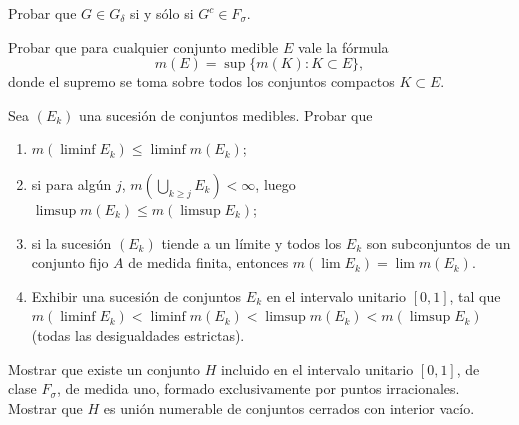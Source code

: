\documentclass{book}
\newcommand{\di}{\displaystyle}
\begin{document}
   \begin{ejer}{}  Probar que $G \in G_{\delta}$ si y sólo si $G^c \in F_{\sigma}$.
\end{ejer} 
 
%





    \begin{ejer}{} 
	Probar que para cualquier conjunto medible $E$ vale la fórmula
   $$m(E)=\sup\{m(K):K\subset E\}, $$
   donde el supremo se toma sobre todos los conjuntos compactos $K \subset E$.
\end{ejer} 

   \begin{ejer}{} 
	Sea $(E_k)$ una sucesión de conjuntos medibles. Probar que
	\begin{enumerate}
    \item $m(\liminf E_k)\leq \liminf m(E_k)$;
    \item si para alg\'un $j$, \;$m\left(\di\bigcup_{k\geq j}E_k\right)<\infty$, luego\; 
    $\limsup m(E_k)\leq m(\limsup E_k)$;
    \item si la sucesión $(E_k)$ tiende a un límite y todos los $E_k$ son subconjuntos
    de un conjunto fijo $A$ de medida finita, entonces \;$m(\lim E_k)=\lim m(E_k)$.
    \item
    Exhibir una sucesión de conjuntos $E_k$ en el intervalo unitario $[0,1]$, tal que 
    $m(\liminf E_k)<\liminf m(E_k)<\limsup m(E_k)<m(\limsup E_k)$  (todas las desigualdades estrictas).
	\end{enumerate}
	\end{ejer} 

   \begin{ejer}{} 
	Mostrar que existe un conjunto $H$ incluido en el intervalo unitario $[0,1]$, de clase
  $F_{\sigma}$, de medida uno, formado exclusivamente por puntos irracionales. 
  \\
  Mostrar que $H$ es unión numerable de conjuntos cerrados con interior vacío.
\end{ejer} 
\end{document}
